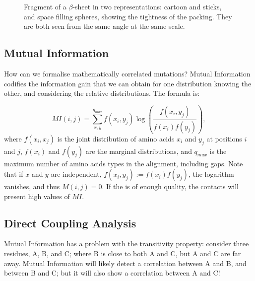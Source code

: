 \begin{figure}[!htb]
	\centering
	\hfil
	\hfil
	\hfil
	\caption{Fragment of a $\beta$-sheet in two representations: cartoon and sticks, and space filling spheres, showing the tightness of the packing.
	They are both seen from the same angle at the same scale.}\label{fig:packing}
\end{figure}


\subsection{Mutual Information}
How can we formalise mathematically correlated mutations?
Mutual Information codifies the information gain that we can obtain for one distribution knowing the other, and considering the relative distributions.
The formula is:

\begin{equation*}
MI\left(i, j\right) = \sum_{x, y}^{q_{max}} f(x_i, y_j) \log \left(\frac{f(x_i, y_j)}{f(x_i)f(y_j)}\right),
\end{equation*}
where $f(x_i, x_j)$ is the joint distribution of amino acids $x_i$ and $y_j$ at positions $i$ and $j$, $f(x_i)$ and $f(y_j)$ are the marginal distributions, and $q_{max}$ is the maximum number of amino acids types in the alignment, including gaps.
Note that if $x$ and $y$ are independent, $f(x_i, y_j) := f(x_i)f(y_j)$, the logarithm vanishes, and thus $M(i, j) = 0$.
If the \MSA{} is of enough quality, the contacts will present high values of $MI$.


\subsection{Direct Coupling Analysis}
Mutual Information has a problem with the transitivity property: consider three residues, A, B, and C; where B is close to both A and C, but A and C are far away.
Mutual Information will likely detect a correlation between A and B, and between B and C; but it will also show a correlation between A and C!

